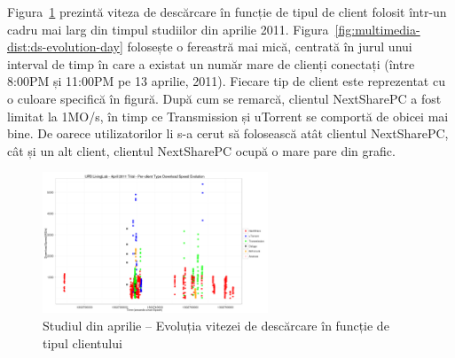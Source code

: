 Figura~\ref{fig:multimedia-dist:ds-evolution-full} prezintă viteza de descărcare
în funcție de tipul de client folosit într-un cadru mai larg din timpul studiilor
din aprilie 2011. Figura~\ref{fig:multimedia-dist:ds-evolution-day} folosește
o fereastră mai mică, centrată în jurul unui interval de timp în care a existat
un număr mare de clienți conectați (între 8:00PM și 11:00PM pe 13 aprilie, 2011).
Fiecare tip de client este reprezentat cu o culoare specifică în figură. După cum
se remarcă, clientul NextSharePC a fost limitat la 1MO/s, în timp ce Transmission
și uTorrent se comportă de obicei mai bine. De oarece utilizatorilor li s-a cerut
să folosească atât clientul NextSharePC, cât și un alt client, clientul NextSharePC
ocupă o mare pare din grafic.

\begin{figure}
  \centering
  \includegraphics[width=0.6\textwidth]{src/img/multimedia-dist/ds-evolution-full}
  \caption{Studiul din aprilie -- Evoluția vitezei de descărcare în funcție de
	  tipul clientului}
  \label{fig:multimedia-dist:ds-evolution-full}
\end{figure}

